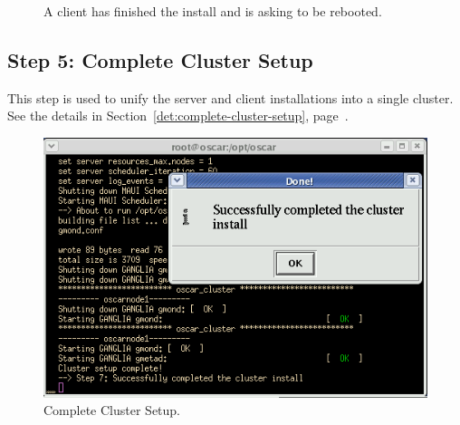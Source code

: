 \begin{figure}[!ht]
  \begin{center}
    \centerline{
      }
    \caption{A client has finished the install and is asking to be
      rebooted.} 
    \label{fig:sbs-install-finish}
  \end{center}
\end{figure}



\clearpage
\subsection{Step 5: Complete Cluster Setup} 

This step is used to unify the server and client installations into a
single cluster.  See the details in
Section~\ref{det:complete-cluster-setup},
page~\pageref{det:complete-cluster-setup}.

\begin{figure}[!ht]
   \begin{center}
     \centerline{\includegraphics[scale=\imgscale]{figs/7_sbs-complete-cluster-setup}}
     \caption{Complete Cluster Setup.}
     \label{fig:sbs-install-wizard-s5}
   \end{center}
 \end{figure}


